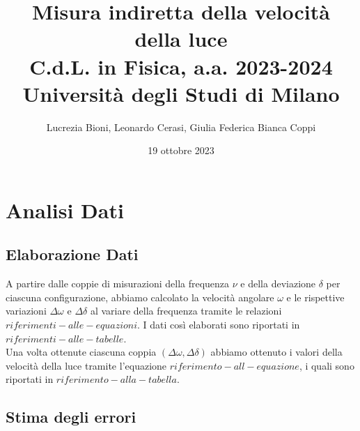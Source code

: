 \documentclass[]{article}
\title{%
    \Huge Misura indiretta della velocità della luce \\
    \Large C.d.L. in Fisica, a.a. 2023-2024 \\ Università degli Studi di Milano}
\author{\LARGE Lucrezia Bioni, Leonardo Cerasi, Giulia Federica Bianca Coppi}
\date{19 ottobre 2023}
\let\oldsection\section%
\renewcommand{\section}{%
	\renewcommand{\theequation}{\thesection.\arabic{equation}}%
	\oldsection}%
\let\oldsubsection\subsection%
\renewcommand{\subsection}{%
	\renewcommand{\theequation}{\thesubsection.\arabic{equation}}%
	\oldsubsection}%
\begin{document}
    \maketitle

    \section{Analisi Dati}

    \subsection{Elaborazione Dati}

    A partire dalle coppie di misurazioni della frequenza $ \nu $ e della deviazione $ \delta $ per ciascuna configurazione, abbiamo calcolato la velocità angolare $ \omega $ e le rispettive variazioni $ \Delta\omega $ e $ \Delta\delta $ al variare della frequenza tramite le relazioni $ riferimenti-alle-equazioni $. I dati così elaborati sono riportati in $ riferimenti-alle-tabelle $. \\
    Una volta ottenute ciascuna coppia $ \left(\Delta\omega,\Delta\delta\right) $ abbiamo ottenuto i valori della velocità della luce tramite l'equazione $ riferimento-all-equazione $, i quali sono riportati in $ riferimento-alla-tabella $.
    
    \subsection{Stima degli errori}
\end{document}
